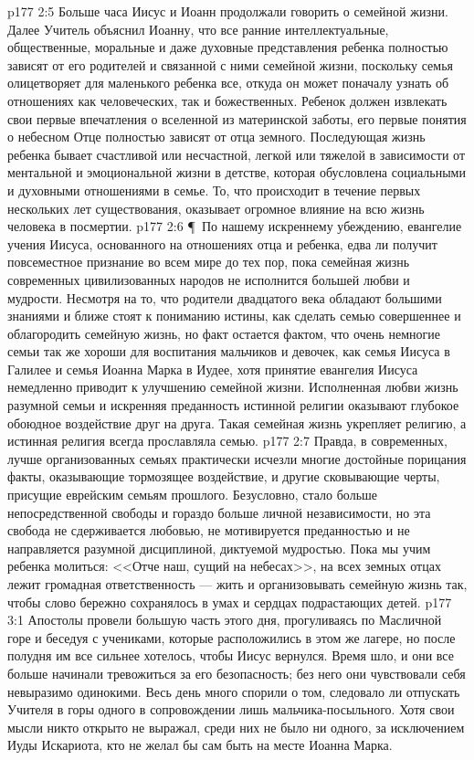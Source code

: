 \vs p177 2:5 Больше часа Иисус и Иоанн продолжали говорить о семейной жизни. Далее Учитель объяснил Иоанну, что все ранние интеллектуальные, общественные, моральные и даже духовные представления ребенка полностью зависят от его родителей и связанной с ними семейной жизни, поскольку семья олицетворяет для маленького ребенка все, откуда он может поначалу узнать об отношениях как человеческих, так и божественных. Ребенок должен извлекать свои первые впечатления о вселенной из материнской заботы, его первые понятия о небесном Отце полностью зависят от отца земного. Последующая жизнь ребенка бывает счастливой или несчастной, легкой или тяжелой в зависимости от ментальной и эмоциональной жизни в детстве, которая обусловлена социальными и духовными отношениями в семье. То, что происходит в течение первых нескольких лет существования, оказывает огромное влияние на всю жизнь человека в посмертии.
\vs p177 2:6 \P\ По нашему искреннему убеждению, евангелие учения Иисуса, основанного на отношениях отца и ребенка, едва ли получит повсеместное признание во всем мире до тех пор, пока семейная жизнь современных цивилизованных народов не исполнится большей любви и мудрости. Несмотря на то, что родители двадцатого века обладают большими знаниями и ближе стоят к пониманию истины, как сделать семью совершеннее и облагородить семейную жизнь, но факт остается фактом, что очень немногие семьи так же хороши для воспитания мальчиков и девочек, как семья Иисуса в Галилее и семья Иоанна Марка в Иудее, хотя принятие евангелия Иисуса немедленно приводит к улучшению семейной жизни. Исполненная любви жизнь разумной семьи и искренняя преданность истинной религии оказывают глубокое обоюдное воздействие друг на друга. Такая семейная жизнь укрепляет религию, а истинная религия всегда прославляла семью.
\vs p177 2:7 Правда, в современных, лучше организованных семьях практически исчезли многие достойные порицания факты, оказывающие тормозящее воздействие, и другие сковывающие черты, присущие еврейским семьям прошлого. Безусловно, стало больше непосредственной свободы и гораздо больше личной независимости, но эта свобода не сдерживается любовью, не мотивируется преданностью и не направляется разумной дисциплиной, диктуемой мудростью. Пока мы учим ребенка молиться: <<Отче наш, сущий на небесах>>, на всех земных отцах лежит громадная ответственность --- жить и организовывать семейную жизнь так, чтобы слово  бережно сохранялось в умах и сердцах подрастающих детей.
\vs p177 3:1 Апостолы провели большую часть этого дня, прогуливаясь по Масличной горе и беседуя с учениками, которые расположились в этом же лагере, но после полудня им все сильнее хотелось, чтобы Иисус вернулся. Время шло, и они все больше начинали тревожиться за его безопасность; без него они чувствовали себя невыразимо одинокими. Весь день много спорили о том, следовало ли отпускать Учителя в горы одного в сопровождении лишь мальчика\hyp{}посыльного. Хотя свои мысли никто открыто не выражал, среди них не было ни одного, за исключением Иуды Искариота, кто не желал бы сам быть на месте Иоанна Марка.
